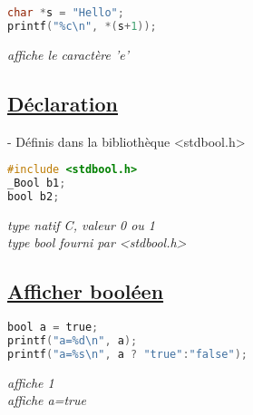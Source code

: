 \documentclass[a3paper,12pt]{article}
\begin{document}
\begin{minipage}[t]{0.49\textwidth}
\begin{tcolorbox}[title=Chaînes de caractères, fonttitle=\large, top=5pt, bottom=0pt, boxsep=1pt, colback=white,
  colframe= orange!30!pink, 
  colbacktitle=orange!30!pink,
  coltitle=white,]
\begin{minipage}[t]{0.5\textwidth}
\begin{lstlisting}[language=C, basicstyle=\small , aboveskip=5pt, belowskip=5pt]
char *s = "Hello";
printf("%c\n", *(s+1));
\end{lstlisting}
\end{minipage}%
\hspace{1em}
\begin{minipage}[t]{0.45\textwidth}
\vspace{0.15em}
\textit{affiche le caractère 'e'}
\end{minipage}
  \end{tcolorbox}
  
  \begin{tcolorbox}[title=Booléens, fonttitle=\large, top=5pt, bottom=5pt, boxsep=1pt, colback=white,
  colframe=black, 
  colbacktitle=black,
  coltitle=white,]
  \subsection*{{\small\underline{Déclaration}}}
- Définis dans la bibliothèque <stdbool.h>

\begin{minipage}[t]{0.5\textwidth} 
  \begin{lstlisting}[language=C, basicstyle=\normalsize, aboveskip=-4pt, belowskip=0pt]
#include <stdbool.h>
_Bool b1;  
bool b2;  
  \end{lstlisting}
  \end{minipage}%
\hfill
\begin{minipage}[t]{0.45\textwidth}
\vspace{1.15em}
\textit{type natif C, valeur 0 ou 1}\\
\textit{type bool fourni par <stdbool.h>}
\end{minipage}
  \vspace{-0.75em}
  \subsection*{{\small \underline{Afficher booléen}}}
\vspace{-1em}
\noindent
\begin{minipage}[t]{0.5\textwidth} 
\begin{lstlisting}[language=C, basicstyle=\normalsize, aboveskip=0pt, belowskip=0pt,showstringspaces=false]
bool a = true;
printf("a=%d\n", a);
printf("a=%s\n", a ? "true":"false");
\end{lstlisting}
\end{minipage}%
\hspace{7.5em}
\begin{minipage}[t]{0.45\textwidth}
\vspace{1.3em}
\textit{affiche 1}\\
 \textit{affiche a=true}
\end{minipage}
\vspace{-1em}

\end{tcolorbox}
\end{minipage}
\end{document}
